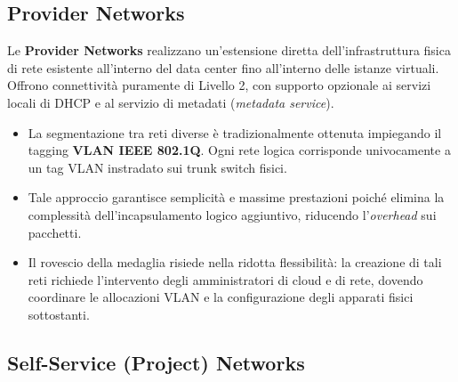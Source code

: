 \documentclass[11pt, a4paper]{article}
\begin{document}
\subsection{Provider Networks}

Le \textbf{Provider Networks} realizzano un'estensione diretta dell'infrastruttura fisica di rete esistente all'interno del data center fino all'interno delle istanze virtuali. Offrono connettività puramente di Livello 2, con supporto opzionale ai servizi locali di DHCP e al servizio di metadati (\emph{metadata service}).
\begin{itemize}[noitemsep]
    \item La segmentazione tra reti diverse è tradizionalmente ottenuta impiegando il tagging \textbf{VLAN IEEE 802.1Q}. Ogni rete logica corrisponde univocamente a un tag VLAN instradato sui trunk switch fisici.
    \item Tale approccio garantisce semplicità e massime prestazioni poiché elimina la complessità dell'incapsulamento logico aggiuntivo, riducendo l'\emph{overhead} sui pacchetti.
    \item Il rovescio della medaglia risiede nella ridotta flessibilità: la creazione di tali reti richiede l'intervento degli amministratori di cloud e di rete, dovendo coordinare le allocazioni VLAN e la configurazione degli apparati fisici sottostanti.
\end{itemize}

\subsection{Self-Service (Project) Networks}
\end{document}
